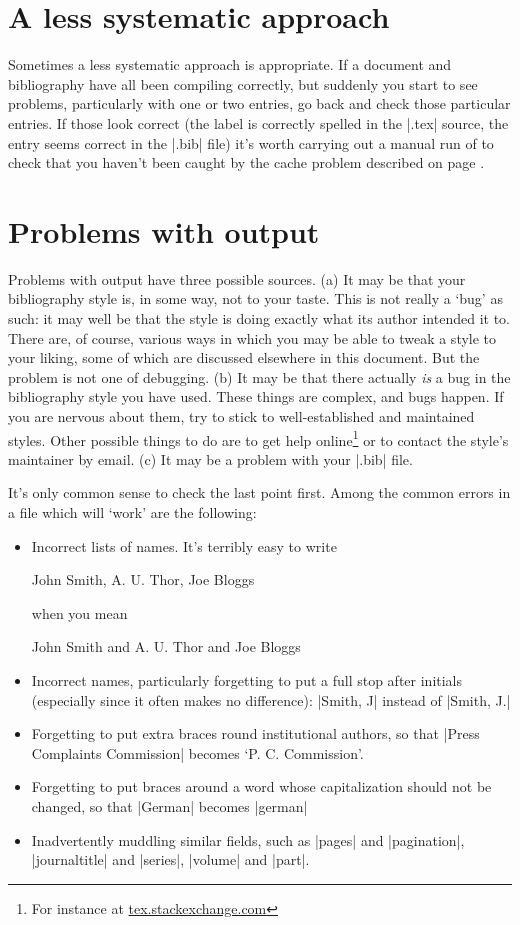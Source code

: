 \section{A less systematic approach}

Sometimes a less systematic approach is appropriate. If a document and bibliography have all been compiling correctly, but suddenly you start to see problems, particularly with one or two entries, go back and check those particular entries. If those look correct (the label is correctly spelled in the |.tex| source, the entry seems correct in the |.bib| file) it's worth carrying out a manual run of  to check that you haven't been caught by the cache problem described on page \pageref{cache}.

\section{Problems with output}

Problems with output have three possible sources. (a) It may be that your bibliography style is, in some way, not to your taste. This is not really a `bug' as such: it may well be that the style is doing exactly what its author intended it to. There are, of course, various ways in which you may be able to tweak a style to your liking, some of which are discussed elsewhere in this document. But the problem is not one of debugging. (b) It may be that there actually \emph{is} a bug in the bibliography style you have used. These things are complex, and bugs happen. If you are nervous about them, try to stick to well-established and maintained styles. Other possible things to do are to get help online\footnote{For instance at \url{tex.stackexchange.com}} or to contact the style's maintainer by email. (c) It may be a problem with your |.bib| file.

It's only common sense to check the last point first. Among the common errors in a file which will `work' are the following:
\begin{itemize}
 \item Incorrect lists of names. It's terribly easy to write
 \begin{pseudoverb}
John Smith, A. U. Thor, Joe Bloggs
 \end{pseudoverb}
 when you mean
 \begin{pseudoverb}
John Smith and A. U. Thor and Joe Bloggs
\end{pseudoverb}
 \item Incorrect names, particularly forgetting to put a full stop after initials (especially since it often makes no difference): |Smith, J| instead of |Smith, J.|
 \item Forgetting to put extra braces round institutional authors, so that |Press Complaints Commission| becomes `P. C. Commission'.
 \item Forgetting to put braces around a word whose capitalization should not be changed, so that |German| becomes |german|
 \item Inadvertently muddling similar fields, such as |pages| and |pagination|, |journaltitle| and |series|, |volume| and |part|.
\end{itemize}